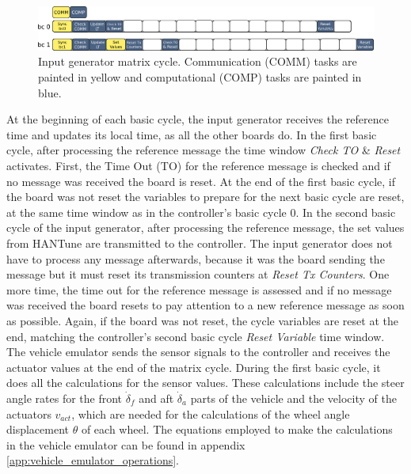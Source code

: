 \documentclass[table,xcdraw]{article}
\begin{document}
\begin{figure}[h!]
    \centering
    \includegraphics[width=\textwidth]{figures/methodology/reference_generator_matrix_cycle.png}
    \caption{Input generator matrix cycle. Communication (COMM) tasks are painted in yellow and computational (COMP) tasks are painted in blue.}
    \label{fig:input_generator_basic_cycle}
\end{figure}

 At the beginning of each basic cycle, the input generator receives the reference time and updates its local time, as all the other boards do. In the first basic cycle, after processing the reference message the time window \textit{Check TO} \& \textit{Reset} activates. First, the Time Out (TO) for the reference message is checked and if no message was received the board is reset. At the end of the first basic cycle, if the board was not reset the variables to prepare for the next basic cycle are reset, at the same time window as in the controller's basic cycle 0. In the second basic cycle of the input generator, after processing the reference message, the set values from HANTune are transmitted to the controller. The input generator does not have to process any message afterwards, because it was the board sending the message but it must reset its transmission counters at \textit{Reset Tx Counters}. One more time, the time out for the reference message is assessed and if no message was received the board resets to pay attention to a new reference message as soon as possible. Again, if the board was not reset, the cycle variables are reset at the end, matching the controller's second basic cycle \textit{Reset Variable} time window.\\
 
The vehicle emulator sends the sensor signals to the controller and receives the actuator values at the end of the matrix cycle. During the first basic cycle, it does all the calculations for the sensor values. These calculations include the steer angle rates for the front $\dot{\delta}_f$ and aft $\dot{\delta}_a$ parts of the vehicle and the velocity of the actuators $v_{act}$, which are needed for the calculations of the wheel angle displacement $\theta$ of each wheel. The equations employed to make the calculations in the vehicle emulator can be found in appendix \ref{app:vehicle_emulator_operations}.\\
\end{document}
